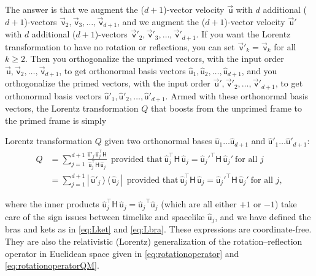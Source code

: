 \documentclass{article}
\newcommand{\metric}{\mathsf{H}}
\newcommand\upvec[1]{\!\vec{\,\mathrm{#1}}}
\newcommand{\Lvec}[1]{\upvec{\mathsf{#1}}} %
\newcommand{\Lhat}[1]{\hat{\mathsf{#1}}} %
\newcommand{\ketbra}[2]{|\,{#1}\,\rangle\,\langle\,{#2}\,|}
\newcommand{\plus}{\!+\!} %
\begin{document}
The answer is that we augment the ($d\plus1$)-vector velocity $\Lvec{u}$ with $d$ additional ($d\plus1$)-vectors $\Lvec{v}_2,\Lvec{v}_3,\ldots,\Lvec{v}_{d+1}$, and we augment the ($d\plus1$)-vector velocity $\Lvec{u}'$ with $d$ additional ($d\plus1$)-vectors $\Lvec{v}'_2,\Lvec{v}'_3,\ldots,\Lvec{v}'_{d+1}$.
If you want the Lorentz transformation to have no rotation or reflections, you can set $\Lvec{v}'_k=\Lvec{v}_k$ for all $k\geq 2$.
Then you orthogonalize the unprimed vectors, with the input order $\Lvec{u},\Lvec{v}_2,\ldots,\Lvec{v}_{d+1}$, to get orthonormal basis vectors $\Lhat{u}_1,\Lhat{u}_2,\ldots,\Lhat{u}_{d+1}$, and you orthogonalize the primed vectors, with the input order $\Lvec{u}',\Lvec{v}'_2,\ldots,\Lvec{v}'_{d+1}$, to get orthonormal basis vectors $\Lhat{u}'_1,\Lhat{u}'_2,\ldots,\Lhat{u}'_{d+1}$.
Armed with these orthonormal basis vectors, the Lorentz transformation $Q$ that boosts from the unprimed frame to the primed frame is simply
\begin{mdframed}
Lorentz transformation $Q$ given two orthonormal bases $\Lhat{u}_1\ldots\Lhat{u}_{d+1}$ and $\Lhat{u}'_1\ldots\Lhat{u}'_{d+1}$:
\begin{align}
    Q &= \sum_{j=1}^{d+1} \frac{\Lhat{u}'_j\,\Lhat{u}_j^\top\metric}{\Lhat{u}_j^\top\metric\,\Lhat{u}_j} ~~ \mbox{provided that} ~ \Lhat{u}_j^\top\metric\,\Lhat{u}_j = \Lhat{u}_j'^\top\metric\,\Lhat{u}_j' ~ \mbox{for all $j$} \label{eq:LT}\\
  &= \sum_{j=1}^{d+1} \ketbra{\Lhat{u}'_j}{\Lhat{u}_j} ~~ \mbox{provided that} ~ \Lhat{u}_j^\top\metric\,\Lhat{u}_j = \Lhat{u}_j'^\top\metric\,\Lhat{u}_j' ~ \mbox{for all $j$} \label{eq:LTQM},
\end{align}
\end{mdframed}
where the inner products $\Lhat{u}_j^\top\metric\,\Lhat{u}_j={\Lhat{u}_j}^\top\Lhat{u}_j$ (which are all either $+1$ or $-1$) take care of the sign issues between timelike and spacelike $\Lhat{u}_j$,
and we have defined the bras and kets as in \eqref{eq:Lket} and \eqref{eq:Lbra}.
These expressions are coordinate-free.
They are also the relativistic (Lorentz) generalization of the rotation--reflection operator in Euclidean space given in \eqref{eq:rotationoperator} and \eqref{eq:rotationoperatorQM}.
\end{document}
